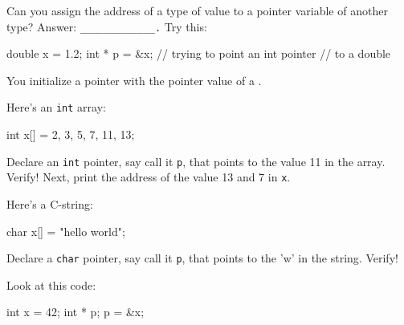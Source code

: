 \begin{ex}
Can you assign the address of a type of value to a pointer variable of another type? Answer: \verb!_____________.! Try this:

\begin{consolethree}[escapeinside=||]
double x = 1.2;
int * p = &x; // trying to point an int pointer
              // to a double
\end{consolethree}
\end{ex}
You  initialize a pointer with the pointer value of a .

\begin{ex}
Here's an \texttt{int} array:

\begin{consolethree}[escapeinside=||]
int x[] = {2, 3, 5, 7, 11, 13};
\end{consolethree}
\end{ex}

Declare an \texttt{int} pointer, say call it \texttt{p}, that points to the value 11 in the array. Verify! Next, print the address of the value 13 and 7 in \texttt{x}.

\begin{ex}
Here's a C-string:

\begin{consolethree}[escapeinside=||]
char x[] = "hello world";
\end{consolethree}
\end{ex}
Declare a \texttt{char} pointer, say call it \texttt{p}, that points to the
'w' in the string. Verify!

\newpage{}

Look at this code:

\begin{consolethree}[escapeinside=||]
int x = 42;
int * p;
p = &x;
\end{consolethree}


